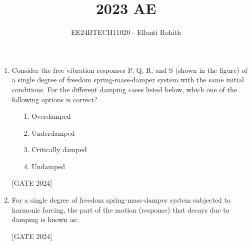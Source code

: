 \documentclass[journal,12pt,onecolumn]{IEEEtran}
\theoremstyle{remark}
\begin{document}

\vspace{3cm}

\title{2023 AE}
\author{EE24BTECH11020  -  Ellanti Rohith}
\maketitle

\renewcommand{\thefigure}{\theenumi}
\renewcommand{\thetable}{\theenumi}






\begin{enumerate}


\item Consider the free vibration responses P, Q, R, and S (shown in the figure) of a single degree of freedom spring-mass-damper system with the same initial conditions. For the different damping cases listed below, which one of the following options is correct?
\begin{enumerate}
            \item[1.] Overdamped
            \item[2.] Underdamped
            \item [3.]Critically damped     
            \item[4.] Undamped
        \end{enumerate}

        \hfill{[GATE 2024]}\begin{enumerate}    
   \end{enumerate}
 
    \item For a single degree of freedom spring-mass-damper system subjected to harmonic forcing, the part of the motion (response) that decays due to damping is known as:

        \hfill{[GATE 2024]}\begin{enumerate}      \end{enumerate}
    


\end{enumerate}
\end{document}
